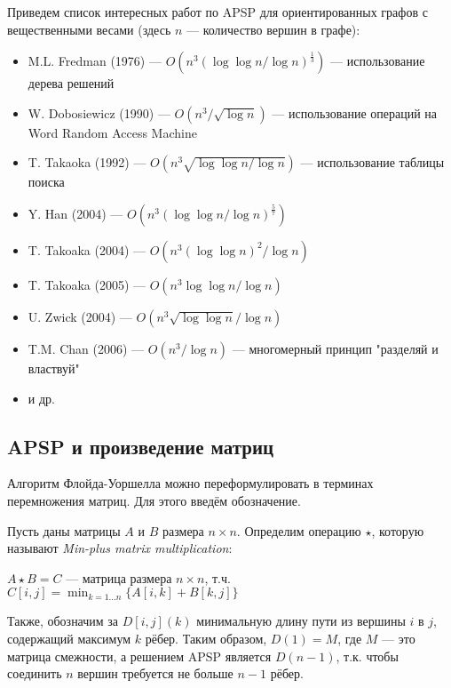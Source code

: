 \begin{remark}
Приведем список интересных работ по APSP для ориентированных графов с вещественными весами (здесь $n$ --- количество вершин в графе):
\begin{itemize}
    \item M.L. Fredman (1976) --- $O(n^3(\log \log n / \log n)^\frac{1}{3})$ --- использование дерева решений~\cite{FredmanAPSP1976}
    \item W. Dobosiewicz (1990) --- $O(n^3 / \sqrt{\log n})$ --- использование операций на Word Random Access Machine~\cite{Dobosiewicz1990}
    \item T. Takaoka (1992) --- $O(n^3 \sqrt{\log \log n / \log n})$ --- использование таблицы поиска~\cite{Takaoka1992}
    \item Y. Han (2004) --- $O(n^3 (\log \log n / \log n)^\frac{5}{7})$~\cite{Han2004}
    \item T. Takoaka (2004) --- $O(n^3 (\log \log n)^2 / \log n)$~\cite{Takaoka2004}
    \item T. Takoaka (2005) --- $O(n^3 \log \log n / \log n)$~\cite{Takaoka2005}
    \item U. Zwick (2004) --- $O(n^3 \sqrt{\log \log n} / \log n)$~\cite{Zwick2004}
    \item T.M. Chan (2006) --- $O(n^3 / \log n)$ --- многомерный принцип "разделяй и властвуй"~\cite{Chan2008}
    \item и др.
\end{itemize}
\end{remark}

\subsection{APSP и произведение матриц}
Алгоритм Флойда-Уоршелла можно переформулировать в терминах перемножения матриц. Для этого введём обозначение.


\begin{definition}
Пусть даны матрицы $A$ и $B$ размера $n \times n$. Определим операцию $\star$, которую называют \textit{Min-plus matrix multiplication}:

    $A \star B = C$ --- матрица размера $n \times n$, т.ч. 
    $C[i,j] = \min_{k = 1 \dots n} \{ A[i,k] + B[k,j] \}$
\end{definition}

Также, обозначим за $D[i,j](k)$ минимальную длину пути из вершины $i$ в $j$, содержащий максимум $k$ рёбер.
Таким образом, $D(1) = M$, где $M$ --- это матрица смежности, а решением APSP является $D(n-1)$, т.к. чтобы соединить $n$ вершин требуется не больше $n-1$ рёбер.

